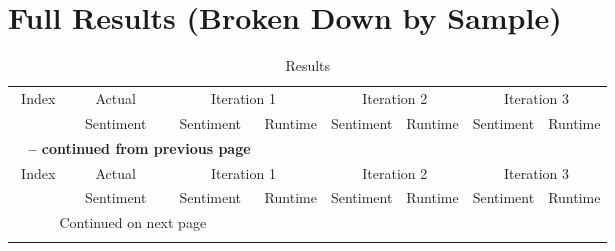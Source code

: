 \section{Full Results (Broken Down by Sample)} %
\label{app:all_results}
	\begin{center}
		\begin{footnotesize}
		\begin{longtable}{cc | cc | cc | cc}
			\label{tab:all_results}\\
			\caption{\normalsize Results}\\
			\toprule
			\multicolumn{1}{c}{Index} &
			\multicolumn{1}{c|}{Actual} &
			\multicolumn{2}{c|}{Iteration 1} &
			\multicolumn{2}{c|}{Iteration 2} &
			\multicolumn{2}{c}{Iteration 3}\\
			& Sentiment & Sentiment & Runtime & Sentiment & Runtime & Sentiment & Runtime\\
			\toprule
			\endfirsthead

			\multicolumn{3}{c}{{\bfseries \tablename\ \thetable{} -- continued from previous page}}\\
			\toprule
			\multicolumn{1}{c}{Index} &
			\multicolumn{1}{c|}{Actual} &
			\multicolumn{2}{c|}{Iteration 1} &
			\multicolumn{2}{c|}{Iteration 2} &
			\multicolumn{2}{c}{Iteration 3}\\
			& Sentiment & Sentiment & Runtime & Sentiment & Runtime & Sentiment & Runtime\\
			\toprule
			\endhead

			\bottomrule
			\multicolumn{3}{c}{{Continued on next page}} \\
			\bottomrule
			\endfoot

			\bottomrule\bottomrule
			\endlastfoot
			

\end{longtable}
\end{footnotesize}
\end{center}
